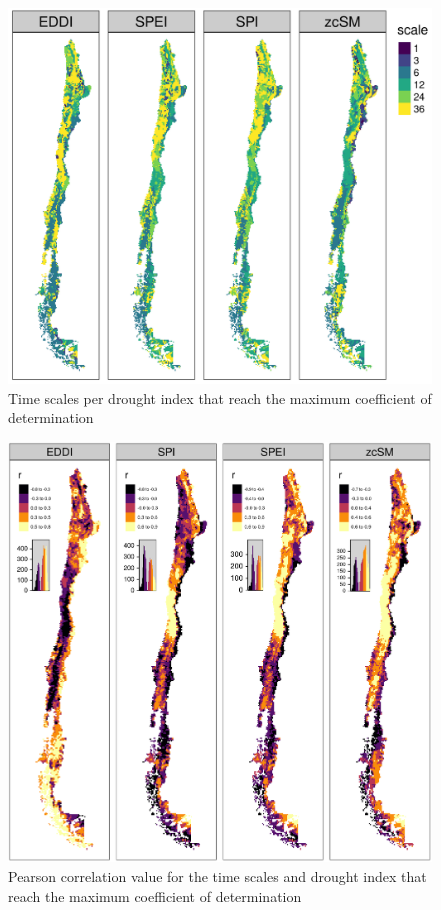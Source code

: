 \documentclass[
  number,
  preprint,
  3p]{elsarticle}
\begin{document}
\begin{figure}[!ht]

{\centering \includegraphics{../output/figs/mapa_cor_selec_indices_zcNDVI6.png}

}

\caption{\label{fig-corTimeScale}Time scales per drought index that
reach the maximum coefficient of determination}

\end{figure}

\begin{figure}[!ht]

{\centering \includegraphics{../output/figs/mapa_cor_r_indices_zcNDVI6.png}

}

\caption{\label{fig-corPerson}Pearson correlation value for the time
scales and drought index that reach the maximum coefficient of
determination}

\end{figure}
\end{document}
